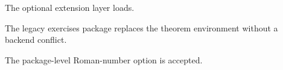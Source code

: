 \documentclass{article}
\begin{document}
 The optional extension layer loads.
\begin{exercise}[5]
The legacy exercises package replaces the theorem environment without a backend conflict.
\end{exercise}
\begin{solution}
The package-level Roman-number option is accepted.
\end{solution}
\end{document}
